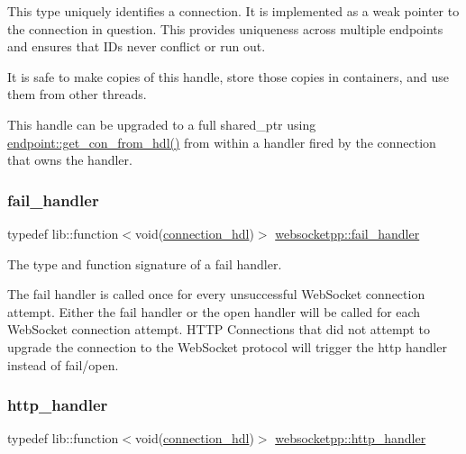 This type uniquely identifies a connection. It is implemented as a weak pointer to the connection in question. This provides uniqueness across multiple endpoints and ensures that I\+Ds never conflict or run out.

It is safe to make copies of this handle, store those copies in containers, and use them from other threads.

This handle can be upgraded to a full shared\+\_\+ptr using {\ttfamily \mbox{\hyperlink{classwebsocketpp_1_1endpoint_a0fe4457427d4124abe7ca022ba7afbb4}{endpoint\+::get\+\_\+con\+\_\+from\+\_\+hdl()}}} from within a handler fired by the connection that owns the handler. \mbox{\label{namespacewebsocketpp_a5bb2e61cfe649b2e012f1a2c5693a4d5}} 
\subsubsection{\texorpdfstring{fail\+\_\+handler}{fail\_handler}}
{\footnotesize\ttfamily typedef lib\+::function$<$void(\mbox{\hyperlink{namespacewebsocketpp_a6b3d26a10ee7229b84b776786332631d}{connection\+\_\+hdl}})$>$ \mbox{\hyperlink{namespacewebsocketpp_a5bb2e61cfe649b2e012f1a2c5693a4d5}{websocketpp\+::fail\+\_\+handler}}}



The type and function signature of a fail handler. 

The fail handler is called once for every unsuccessful Web\+Socket connection attempt. Either the fail handler or the open handler will be called for each Web\+Socket connection attempt. H\+T\+TP Connections that did not attempt to upgrade the connection to the Web\+Socket protocol will trigger the http handler instead of fail/open. \mbox{\label{namespacewebsocketpp_a37bc4d5b3b21d3bb494d8a23236315d2}} 
\subsubsection{\texorpdfstring{http\+\_\+handler}{http\_handler}}
{\footnotesize\ttfamily typedef lib\+::function$<$void(\mbox{\hyperlink{namespacewebsocketpp_a6b3d26a10ee7229b84b776786332631d}{connection\+\_\+hdl}})$>$ \mbox{\hyperlink{namespacewebsocketpp_a37bc4d5b3b21d3bb494d8a23236315d2}{websocketpp\+::http\+\_\+handler}}}



